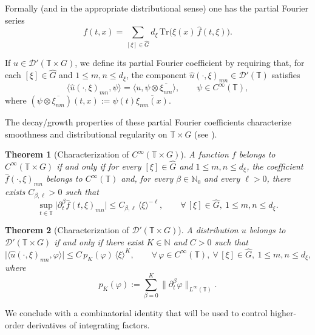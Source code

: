 \documentclass[11pt,reqno]{amsart}
\numberwithin{equation}{section}
\newtheorem{theorem}{Theorem}[section]
\begin{document}
	Formally (and in the appropriate distributional sense) one has the partial Fourier series
	\begin{equation*}\label{eq:partial_FS_rewrite}
		f(t,x)=\sum_{[\xi]\in\widehat{G}} d_\xi\,\mathrm{Tr}\bigl(\xi(x)\,\widehat{f}(t,\xi)\bigr).
	\end{equation*}
	
	If $u\in\mathcal{D}'(\mathbb{T}\times G)$, we define its partial Fourier coefficient by requiring that, for each $[\xi]\in\widehat{G}$ and
	$1\le m,n\le d_\xi$, the component $\widehat{u}(\cdot,\xi)_{mn}\in\mathcal{D}'(\mathbb{T})$ satisfies
	\[
	\langle \widehat{u}(\cdot,\xi)_{mn},\psi\rangle=\langle u,\psi\otimes\overline{\xi_{nm}}\rangle,
	\qquad \psi\in C^\infty(\mathbb{T}),
	\]
	where $(\psi\otimes\overline{\xi_{nm}})(t,x):=\psi(t)\overline{\xi_{nm}(x)}$.
	
	The decay/growth properties of these partial Fourier coefficients characterize smoothness and distributional regularity on $\mathbb{T}\times G$ (see \cite{KMR20}).
	
	\begin{theorem}[Characterization of $C^\infty(\mathbb{T}\times G)$]\label{thm:Cinf_char_rewrite}
	A function $f$ belongs to $C^\infty(\mathbb{T}\times G)$ if and only if for every $[\xi]\in\widehat{G}$ and $1\le m,n\le d_\xi$,
	the coefficient $\widehat{f}(\cdot,\xi)_{mn}$ belongs to $C^\infty(\mathbb{T})$ and, for every $\beta\in\mathbb{N}_0$ and every $\ell>0$,
	there exists $C_{\beta,\ell}>0$ such that
	\[
	\sup_{t\in\mathbb{T}}\bigl|\partial_t^\beta \widehat{f}(t,\xi)_{mn}\bigr|\le C_{\beta,\ell}\,\langle\xi\rangle^{-\ell},\qquad\forall\,[\xi]\in\widehat{G},\ 1\le m,n\le d_\xi.
	\]
	\end{theorem}
	
	\begin{theorem}[Characterization of $\mathcal{D}'(\mathbb{T}\times G)$]\label{thm:Dprime_char_rewrite}
	A distribution $u$ belongs to $\mathcal{D}'(\mathbb{T}\times G)$ if and only if there exist $K\in\mathbb{N}$ and $C>0$ such that
	\[
	\bigl|\langle \widehat{u}(\cdot,\xi)_{mn},\varphi\rangle\bigr|
	\le C\,p_K(\varphi)\,\langle\xi\rangle^K,\qquad \forall\,\varphi\in C^\infty(\mathbb{T}),\ \forall\,[\xi]\in\widehat{G},\ 1\le m,n\le d_\xi,
	\]
	where
	\[
	p_K(\varphi):=\sum_{\beta=0}^K \|\partial_t^\beta \varphi\|_{L^\infty(\mathbb{T})}.
	\]
	\end{theorem}
	
	We conclude with a combinatorial identity that will be used to control higher-order derivatives of integrating factors.
	
\end{document}
